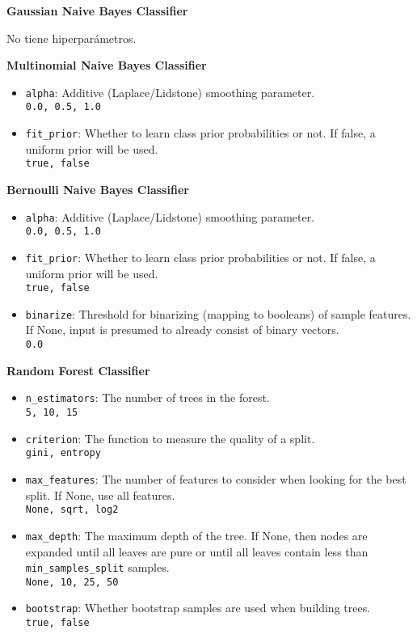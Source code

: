 \noindent \textbf{Gaussian Naive Bayes Classifier}

No tiene hiperpar\'ametros.

\noindent \textbf{Multinomial Naive Bayes Classifier}
\begin{itemize}
	\item \texttt{alpha}: Additive (Laplace/Lidstone) smoothing parameter.\\
	\texttt{0.0, 0.5, 1.0}
	\item \texttt{fit\_prior}: Whether to learn class prior probabilities or not. If false, a uniform prior will be used.\\
	\texttt{true, false}
\end{itemize}

\noindent \textbf{Bernoulli Naive Bayes Classifier}
\begin{itemize}
	\item \texttt{alpha}: Additive (Laplace/Lidstone) smoothing parameter.\\
	\texttt{0.0, 0.5, 1.0}
	\item \texttt{fit\_prior}: Whether to learn class prior probabilities or not. If false, a uniform prior will be used.\\
	\texttt{true, false}
	\item \texttt{binarize}: Threshold for binarizing (mapping to booleans) of sample features. If None, input is presumed to already consist of binary vectors.\\
	\texttt{0.0}
\end{itemize}

\noindent \textbf{Random Forest Classifier}
\begin{itemize}
	\item \texttt{n\_estimators}: The number of trees in the forest.\\
	\texttt{5, 10, 15}
	\item \texttt{criterion}: The function to measure the quality of a split.\\
	\texttt{gini, entropy}
	\item \texttt{max\_features}: The number of features to consider when looking for the best split. If None, use all features.\\
	\texttt{None, sqrt, log2}
	\item \texttt{max\_depth}: The maximum depth of the tree. If None, then nodes are expanded until all leaves are pure or until all leaves contain less than \texttt{min\_samples\_split} samples.\\
	\texttt{None, 10, 25, 50}
	\item \texttt{bootstrap}: Whether bootstrap samples are used when building trees.\\
	\texttt{true, false}
\end{itemize}

